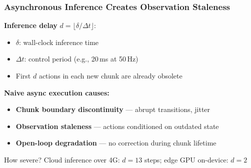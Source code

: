 \documentclass[aspectratio=1610]{beamer}
\begin{document}
\begin{frame}
\frametitle{Asynchronous Inference Creates Observation Staleness}

\textbf{Inference delay} $d = \lfloor \delta / \Delta t \rfloor$:
\begin{itemize}
    \item $\delta$: wall-clock inference time
    \item $\Delta t$: control period (e.g., 20\,ms at 50\,Hz)
    \item First $d$ actions in each new chunk are \alert{already obsolete}
\end{itemize}

\vspace{0.5em}
\textbf{Naive async execution causes:}
\begin{itemize}
    \item \textbf{Chunk boundary discontinuity} --- abrupt transitions, jitter
    \item \textbf{Observation staleness} --- actions conditioned on outdated state
    \item \textbf{Open-loop degradation} --- no correction during chunk lifetime
\end{itemize}

\vspace{0.5em}
\begin{block}{How severe?}
Cloud inference over 4G: $d = 13$ steps; edge GPU on-device: $d = 2$
\end{block}

\end{frame}
\end{document}
